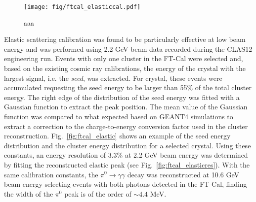 \begin{figure}
\texttt{[image: fig/ftcal\_elasticcal.pdf]}
\caption{aaa}
\label{fig:ftcal_elasticcal}
\end{figure}
Elastic scattering calibration was found to be particularly effective at low beam energy and was performed using 2.2 GeV beam data recorded during the CLAS12 engineering run. Events with only one cluster in the FT-Cal were selected and, based on the existing cosmic ray calibrations, the energy of the crystal with the largest signal, i.e. the {\it seed}, was extracted. For crystal, these events were accumulated requesting the seed energy to be larger than 55\% of the total cluster energy. The right edge of the distribution of the seed energy was fitted with a Gaussian function to extract the peak position. The mean value of the Gaussian function was compared to what expected based on GEANT4 simulations to extract a correction to the charge-to-energy conversion factor used in the cluster reconstruction. Fig.~\ref{fig:ftcal_elastic} shows an example of the seed energy distribution and the cluster energy distribution for a selected crystal. Using these constants, an energy resolution of  3.3\% at 2.2 GeV beam energy was determined by fitting the reconstructed elastic peak (see Fig.~\ref{fig:ftcal_elasticres}). With the same calibration constants, the $\pi^0\to\gamma\gamma$ decay was reconstructed at 10.6 GeV beam energy selecting events with both photons detected in the FT-Cal, finding the width of the $\pi^0$ peak is of the order of $\sim 4.4$ MeV.
